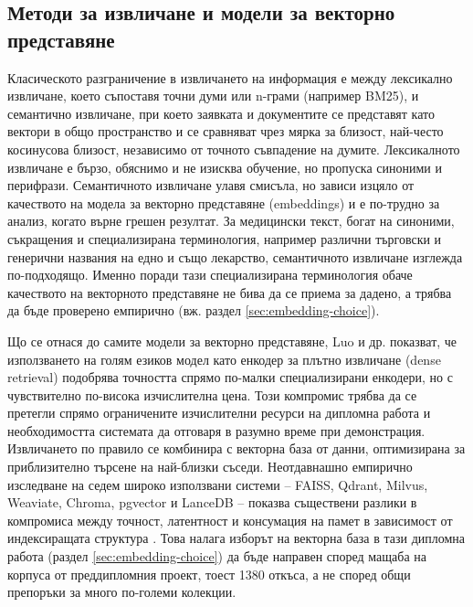 \documentclass[12pt,a4paper]{article}
\begin{document}
\subsection{Методи за извличане и модели за векторно представяне}
\label{sec:retrieval-methods}
Класическото разграничение в извличането на информация е между лексикално извличане, което съпоставя точни думи или n-грами (например BM25), и семантично извличане, при което заявката и документите се представят като вектори в общо пространство и се сравняват чрез мярка за близост, най-често косинусова близост, независимо от точното съвпадение на думите. Лексикалното извличане е бързо, обяснимо и не изисква обучение, но пропуска синоними и перифрази. Семантичното извличане улавя смисъла, но зависи изцяло от качеството на модела за векторно представяне (embeddings) и е по-трудно за анализ, когато върне грешен резултат. За медицински текст, богат на синоними, съкращения и специализирана терминология, например различни търговски и генерични названия на едно и също лекарство, семантичното извличане изглежда по-подходящо. Именно поради тази специализирана терминология обаче качеството на векторното представяне не бива да се приема за дадено, а трябва да бъде проверено емпирично (вж. раздел \ref{sec:embedding-choice}).

Що се отнася до самите модели за векторно представяне, Luo и др. \cite{luo2024llmdenseretrieval} показват, че използването на голям езиков модел като енкодер за плътно извличане (dense retrieval) подобрява точността спрямо по-малки специализирани енкодери, но с чувствително по-висока изчислителна цена. Този компромис трябва да се претегли спрямо ограничените изчислителни ресурси на дипломна работа и необходимостта системата да отговаря в разумно време при демонстрация. Извличането по правило се комбинира с векторна база от данни, оптимизирана за приблизително търсене на най-близки съседи. Неотдавнашно емпирично изследване на седем широко използвани системи -- FAISS, Qdrant, Milvus, Weaviate, Chroma, pgvector и LanceDB -- показва съществени разлики в компромиса между точност, латентност и консумация на памет в зависимост от индексиращата структура \cite{rashmiks2026vectordb}. Това налага изборът на векторна база в тази дипломна работа (раздел \ref{sec:embedding-choice}) да бъде направен според мащаба на корпуса от преддипломния проект, тоест 1380 откъса, а не според общи препоръки за много по-големи колекции.
\end{document}
